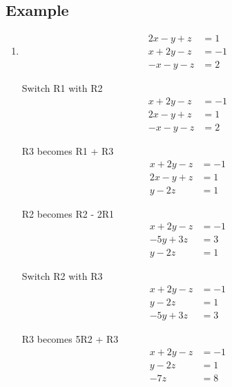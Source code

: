 \documentclass[11pt]{article}
\begin{document}
\subsection*{Example}
\begin{enumerate}[ (i) ]
\item
\begin{align*}
2x - y + z &= 1 \\
x + 2y - z &= -1 \\
-x - y - z &= 2
\end{align*}

Switch R1 with R2
\begin{align*}
x + 2y - z &= -1 \\
2x - y + z &= 1 \\
-x - y - z &= 2
\end{align*}

R3 becomes R1 + R3
\begin{align*}
x + 2y - z &= -1 \\
2x - y + z &= 1 \\
y -2z &= 1
\end{align*}

R2 becomes R2 - 2R1
\begin{align*}
x + 2y - z &= -1 \\
- 5y + 3z &= 3 \\
y -2z &= 1
\end{align*}

Switch R2 with R3
\begin{align*}
x + 2y - z &= -1 \\
y -2z &= 1 \\
- 5y + 3z &= 3
\end{align*}

R3 becomes 5R2 + R3
\begin{align*}
x + 2y - z &= -1 \\
y -2z &= 1 \\
-7z &= 8
\end{align*}


\end{enumerate}
\end{document}
